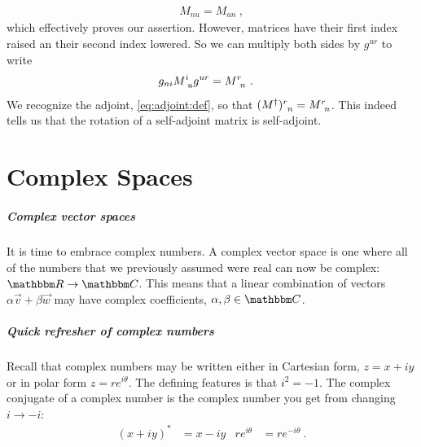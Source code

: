 \documentclass[12pt, oneside]{report}    %
\begin{document}
\begin{subappendices}
\begin{align}
    M_{nu} = M_{un} \ ,
\end{align}
which effectively proves our assertion. However, matrices have their first index raised an their second index lowered. So we can multiply both sides by $g^{ur}$ to write
\begin{align}
    g_{ni}M\aij{i}{u}g^{ur} &= M\aij{r}{n} \ .
\end{align}
We recognize the adjoint, \eqref{eq:adjoint:def}, so that $(M^\dag)\aij{r}{n} = M\aij{r}{n}$. This indeed tells us that the rotation of a self-adjoint matrix is self-adjoint. 

\end{subappendices}



\chapter{Complex Spaces}




\paragraph{Complex vector spaces}
It is time to embrace complex numbers. A complex vector space is one where all of the numbers that we previously assumed were real can now be complex: $\RR \to \CC$. This means that a linear combination of vectors $\alpha\vec{v}+ \beta\vec{w}$ may have complex coefficients, $\alpha,\beta\in\CC$. 

\paragraph{Quick refresher of complex numbers}
Recall that complex numbers may be written either in Cartesian form, $z = x+iy$ or in polar form $z= re^{i\theta}$. The defining features is that $i^2 = -1$. The complex conjugate of a complex number is the complex number you get from changing $i\to -i$:
\begin{align}
    (x+iy)^* &= x-iy
    &
    re^{i\theta} &= re^{-i\theta} \ .
\end{align}
\end{document}
